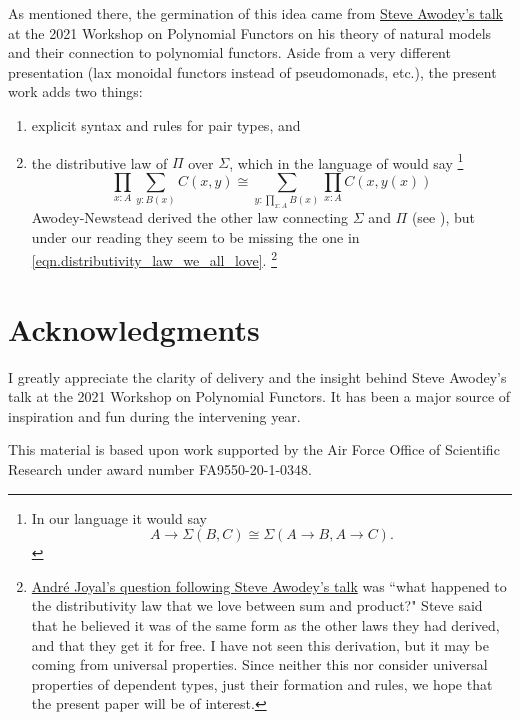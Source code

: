 \documentclass[11pt, one side, article]{memoir}
\theoremstyle{definition}
\theoremstyle{plain}
\newcommand{\0}{\textsf{0}}
\newcommand{\1}{\tn{\textsf{1}}}
\begin{document}
As mentioned there, the germination of this idea came from \href{https://www.youtube.com/watch?v=RDuNIP4icKI\&t=10765s}{Steve Awodey's talk} at the 2021 Workshop on Polynomial Functors on his theory of natural models and their connection to polynomial functors. Aside from a very different presentation (lax monoidal functors instead of pseudomonads, etc.), the present work adds two things:
\begin{enumerate}
	\item explicit syntax and rules for pair types, and
	\item the distributive law of $\Pi$ over $\Sigma$, which in the language of \cite{awodey2018polynomial} would say%
	\footnote{In our language it would say 
	\[
	A\to\Sigma(B,C)\cong \Sigma(A\to B,A\to C).
	\]
	}
	\begin{equation}\label{eqn.distributivity_law_we_all_love}
	\prod_{x:A}\sum_{y:B(x)}C(x,y)\cong\sum_{y:\prod_{x:A}B(x)}\prod_{x:A}C(x,y(x))
	\end{equation}
	Awodey-Newstead derived the other law connecting $\Sigma$ and $\Pi$ (see \cite[Remark 4.2]{awodey2018polynomial}), but under our reading they seem to be missing the one in \eqref{eqn.distributivity_law_we_all_love}.%
	\footnote{\href{https://youtu.be/RDuNIP4icKI?t=13898}{Andr\'{e} Joyal's question following Steve Awodey's talk} was ``what happened to the distributivity law that we love between sum and product?" Steve said that he believed it was of the same form as the other laws they had derived, and that they get it for free. I have not seen this derivation, but it may be coming from universal properties. Since neither this nor \cite{awodey2018polynomial} consider universal properties of dependent types, just their formation and rules, we hope that the present paper will be of interest.
	}
\end{enumerate}

\section{Acknowledgments}

I greatly appreciate the clarity of delivery and the insight behind Steve Awodey's talk at the 2021 Workshop on Polynomial Functors. It has been a major source of inspiration and fun during the intervening year. 

This material is based upon work supported by the Air Force Office of Scientific Research under award number FA9550-20-1-0348.
\end{document}
